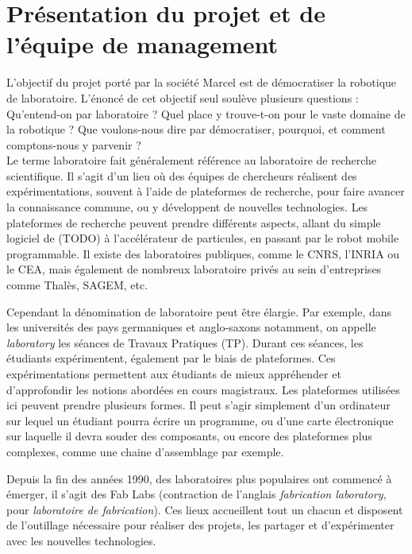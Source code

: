\documentclass[a4paper,12pt]{report}
\begin{document}




\section{Présentation du projet et de l'équipe de management}
L'objectif du projet porté par la société Marcel est de démocratiser la robotique de laboratoire.
L'énoncé de cet objectif seul soulève plusieurs questions : Qu'entend-on par laboratoire ? Quel place y trouve-t-on pour le vaste domaine de la robotique ?
Que voulons-nous dire par démocratiser, pourquoi, et comment comptons-nous y parvenir ?\\

Le terme laboratoire fait généralement référence au laboratoire de recherche scientifique.
Il s'agit d'un lieu où des équipes de chercheurs réalisent des expérimentations, souvent à l'aide de plateformes de recherche,
pour faire avancer la connaissance commune, ou y développent de nouvelles technologies.
Les plateformes de recherche peuvent prendre différents aspects, allant du simple logiciel de (TODO) à l'accélérateur de particules, en passant par le robot mobile programmable.
Il existe des laboratoires publiques, comme le CNRS, l'INRIA ou le CEA, mais également de nombreux laboratoire privés au sein d'entreprises comme Thalès, SAGEM, etc.

Cependant la dénomination de laboratoire peut être élargie. 
Par exemple, dans les universités des pays germaniques et anglo-saxons notamment, on appelle \emph{laboratory} les séances de Travaux Pratiques (TP).
Durant ces séances, les étudiants expérimentent, également par le biais de plateformes.
Ces expérimentations permettent aux étudiants de mieux appréhender et d'approfondir les notions abordées en cours magistraux.
Les plateformes utilisées ici peuvent prendre plusieurs formes.
Il peut s'agir simplement d'un ordinateur sur lequel un étudiant pourra écrire un programme, 
ou d'une carte électronique sur laquelle il devra souder des composants, ou encore des plateformes plus complexes, comme une chaine d'assemblage par exemple.

Depuis la fin des années 1990, des laboratoires plus populaires ont commencé à émerger,
il s'agit des Fab Labs (contraction de l'anglais \emph{fabrication laboratory}, pour \emph{laboratoire de fabrication}).
Ces lieux accueillent tout un chacun et disposent de l'outillage nécessaire pour réaliser des projets, les partager et d'expérimenter avec les nouvelles technologies.
\end{document}
